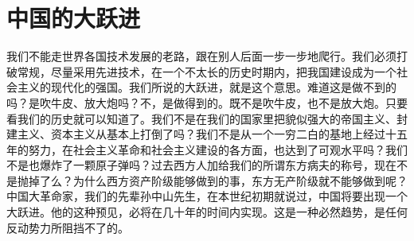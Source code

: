 \section[中国的大跃进（一九六四年十二月）]{中国的大跃进}


我们不能走世界各国技术发展的老路，跟在别人后面一步一步地爬行。我们必须打破常规，尽量采用先进技术，在一个不太长的历史时期内，把我国建设成为一个社会主义的现代化的强国。我们所说的大跃进，就是这个意思。难道这是做不到的吗？是吹牛皮、放大炮吗？不，是做得到的。既不是吹牛皮，也不是放大炮。只要看我们的历史就可以知道了。我们不是在我们的国家里把貌似强大的帝国主义、封建主义、资本主义从基本上打倒了吗？我们不是从一个一穷二白的基地上经过十五年的努力，在社会主义革命和社会主义建设的各方面，也达到了可观水平吗？我们不是也爆炸了一颗原子弹吗？过去西方人加给我们的所谓东方病夫的称号，现在不是抛掉了么？为什么西方资产阶级能够做到的事，东方无产阶级就不能够做到呢？中国大革命家，我们的先辈孙中山先生，在本世纪初期就说过，中国将要出现一个大跃进。他的这种预见，必将在几十年的时间内实现。这是一种必然趋势，是任何反动势力所阻挡不了的。



